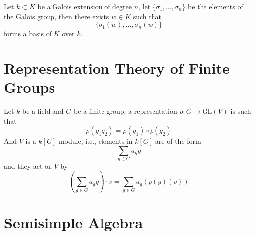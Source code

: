 \documentclass[openany]{book}
\begin{document}
\begin{prop}
    Let $k\subset K$ be a Galois extension of degree $n$, let $\{\sigma_1,\dots,\sigma_n\}$ be the elements of the Galois group, then there exists $w\in K$ such that 
    \begin{equation*}
        \{\sigma_1(w),\dots, \sigma_n(w)\}
    \end{equation*}
    forms a basis of $K$ over $k$.
\end{prop}


\chapter{Representation Theory of Finite Groups}



Let $k$ be a field and $G$ be a finite group, a representation $\rho: G\to\text{GL}(V)$ is such that 
\begin{equation*}
    \rho(g_1g_2)=\rho(g_1)\circ\rho(g_2)
\end{equation*}
And $V$ is a $k[G]$-module, i.e., elements in $k[G]$ are of the form 
\begin{equation*}
    \sum_{g\in G}a_gg
\end{equation*}
and they act on $V$ by 
\begin{equation*}
    \left( \sum_{g\in G}a_gg\right)\cdot v=\sum_{g\in G}a_g\left(\rho(g)(v)\right)
\end{equation*}






\chapter{Semisimple Algebra}


\newpage
\end{document}

